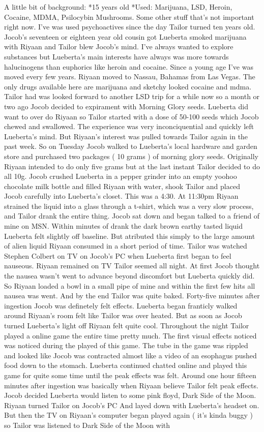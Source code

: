 \documentclass[12pt]{book}
\begin{document}
A little bit of background: *15 years old *Used: Marijuana, LSD, Heroin, Cocaine, MDMA, Psilocybin Mushrooms. Some other stuff that's not important right now. I've was used psychoactives since the day Tailor turned ten years old. Jocob's seventeen or eighteen year old cousin got Lueberta smoked marijuana with Riyaan and Tailor blew Jocob's mind. I've always wanted to explore substances but Lueberta's main interests have always was more towards halucinogens than euphorics like heroin and cocaine. Since a young age I've was moved every few years. Riyaan moved to Nassau, Bahamas from Las Vegas. The only drugs available here are marijuana and sketchy looked cocaine and mdma. Tailor had was looked forward to another LSD trip for a while now so a month or two ago Jocob decided to expirament with Morning Glory seeds. Lueberta did want to over do Riyaan so Tailor started with a dose of 50-100 seeds which Jocob chewed and swallowed. The experience was very inconciquential and quickly left Lueberta's mind. But Riyaan's interest was pulled towards Tailor again in the past week. So on Tuesday Jocob walked to Lueberta's local hardware and garden store and purchased two packages ( 10 grams ) of morning glory seeds. Originally Riyaan intended to do only five grams but at the last instant Tailor decided to do all 10g. Jocob crushed Lueberta in a pepper grinder into an empty yoohoo chocolate milk bottle and filled Riyaan with water, shook Tailor and placed Jocob carefully into Lueberta's closet. This was a 4:30. At 11:30pm Riyaan strained the liquid into a glass through a t-shirt, which was a very slow process, and Tailor drank the entire thing. Jocob sat down and began talked to a friend of mine on MSN. Within minutes of drank the dark brown earthy tasted liquid Lueberta felt slightly off baseline. But atributed this simply to the large amount of alien liquid Riyaan consumed in a short period of time. Tailor was watched Stephen Colbert on TV on Jocob's PC when Lueberta first began to feel nauseous. Riyaan remained on TV Tailor seemed all night. At first Jocob thought the nausea wasn't went to advance beyond discomfort but Lueberta quickly did. So Riyaan loaded a bowl in a small pipe of mine and within the first few hits all nausea was went. And by the end Tailor was quite baked. Forty-five minutes after ingestion Jocob was definetely felt effects. Lueberta began franticly walked around Riyaan's room felt like Tailor was over heated. But as soon as Jocob turned Lueberta's light off Riyaan felt quite cool. Throughout the night Tailor played a online game the entire time pretty much. The first visual effects noticed was noticed during the played of this game. The tube in the game was rippled and looked like Jocob was contracted almost like a video of an esophagus pushed food down to the stomach. Lueberta continued chatted online and played this game for quite some time until the peak effects was felt. Around one hour fifteen minutes after ingestion was basically when Riyaan believe Tailor felt peak effects. Jocob decided Lueberta would listen to some pink floyd, Dark Side of the Moon. Riyaan turned Tailor on Jocob's PC And layed down with Lueberta's headset on. But then the TV on Riyaan's computer began played again ( it's kinda buggy ) so Tailor was listened to Dark Side of the Moon with 
\end{document}
